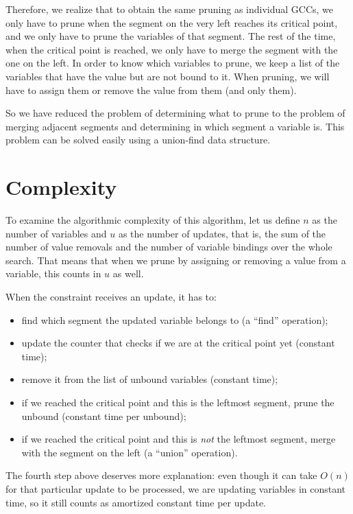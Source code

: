 \documentclass[a4paper,10pt]{article}
\begin{document}
Therefore, we realize that to obtain the same pruning as individual GCCs, we only have to prune when the segment on the very left reaches its critical point, and we only have to prune the variables of that segment. The rest of the time, when the critical point is reached, we only have to merge the segment with the one on the left. In order to know which variables to prune, we keep a list of the variables that have the value but are not bound to it. When pruning, we will have to assign them or remove the value from them (and only them).

So we have reduced the problem of determining what to prune to the problem of merging adjacent segments and determining in which segment a variable is. This problem can be solved easily using a union-find data structure.

\section{Complexity}

To examine the algorithmic complexity of this algorithm, let us define $n$ as the number of variables and $u$ as the number of updates, that is, the sum of the number of value removals and the number of variable bindings over the whole search. That means that when we prune by assigning or removing a value from a variable, this counts in $u$ as well.

When the constraint receives an update, it has to:
\begin{itemize}
    \item find which segment the updated variable belongs to (a ``find'' operation);
    \item update the counter that checks if we are at the critical point yet (constant time);
    \item remove it from the list of unbound variables (constant time);
    \item if we reached the critical point and this is the leftmost segment, prune the unbound (constant time per unbound);
    \item if we reached the critical point and this is \emph{not} the leftmost segment, merge with the segment on the left (a ``union'' operation).
\end{itemize}

The fourth step above deserves more explanation: even though it can take $O(n)$ for that particular update to be processed, we are updating variables in constant time, so it still counts as amortized constant time per update.
\end{document}
